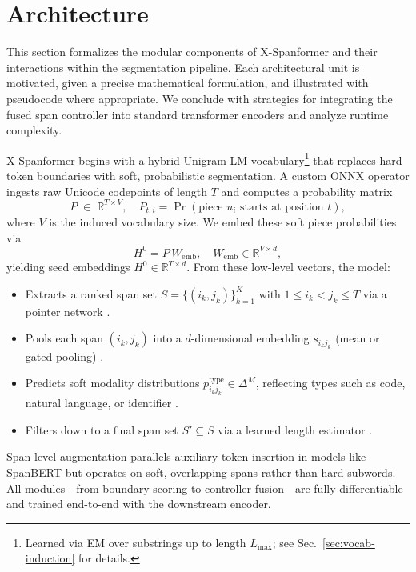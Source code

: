 \section{Architecture}

This section formalizes the modular components of X-Spanformer and their interactions within the segmentation pipeline.  Each architectural unit is motivated, given a precise mathematical formulation, and illustrated with pseudocode where appropriate.  We conclude with strategies for integrating the fused span controller into standard transformer encoders and analyze runtime complexity.

X-Spanformer begins with a hybrid Unigram-LM vocabulary\footnote{Learned via EM over substrings up to length \(L_{\max}\); see Sec.~\ref{sec:vocab-induction} for details.} that replaces hard token boundaries with soft, probabilistic segmentation.  A custom ONNX operator ingests raw Unicode codepoints of length \(T\) and computes a probability matrix  
\[
P \;\in\;\mathbb{R}^{T\times V}, 
\quad
P_{t,i} = \Pr(\text{piece }u_i\text{ starts at position }t),
\]
where \(V\) is the induced vocabulary size.  We embed these soft piece probabilities via  
\[
H^0 = P\,W_{\mathrm{emb}},
\quad
W_{\mathrm{emb}}\in\mathbb{R}^{V\times d},
\]
yielding seed embeddings \(H^0\in\mathbb{R}^{T\times d}\).  From these low-level vectors, the model:

\begin{itemize}
	\item Extracts a ranked span set \(S=\{(i_k,j_k)\}_{k=1}^K\) with \(1\le i_k<j_k\le T\) via a pointer network \cite{vinyals2015pointer}.
	\item Pools each span \((i_k,j_k)\) into a \(d\)-dimensional embedding \(s_{i_kj_k}\) (mean or gated pooling) \cite{tay2021charformer}.
	\item Predicts soft modality distributions \(p^\mathrm{type}_{i_kj_k}\in\Delta^M\), reflecting types such as code, natural language, or identifier \cite{lin2021codemix,li2021prefix}.
	\item Filters down to a final span set \(S'\subseteq S\) via a learned length estimator \cite{cheng2021masked}.
\end{itemize}

Span-level augmentation parallels auxiliary token insertion in models like SpanBERT \cite{joshi2020spanbert} but operates on soft, overlapping spans rather than hard subwords.  All modules—from boundary scoring to controller fusion—are fully differentiable and trained end-to-end with the downstream encoder.










